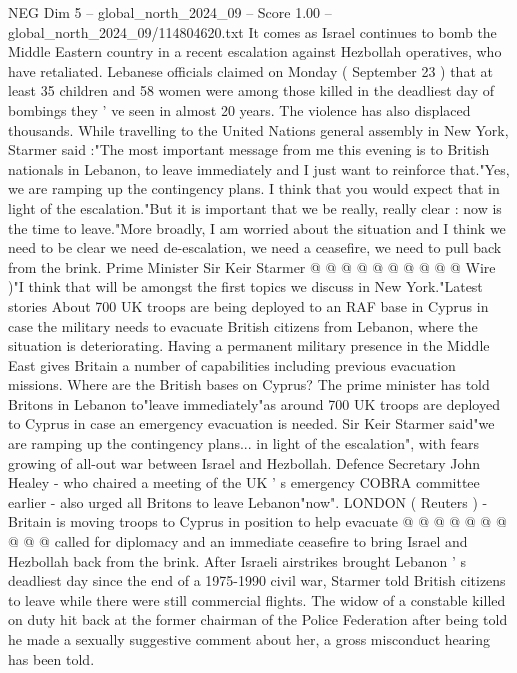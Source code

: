 \begin{textsample}{NEG Dim 5 – global\_north\_2024\_09 – Score 1.00 – global\_north\_2024\_09/114804620.txt}  \label{ex:f5_neg_094}
It comes as Israel continues to bomb the Middle Eastern country in a recent escalation against Hezbollah operatives, who have retaliated.
Lebanese officials claimed on Monday ( September 23 ) that at least 35 children and 58 women were among those killed in the deadliest day of bombings they ' ve seen in almost 20 years.
The violence has also displaced thousands.
While travelling to the United Nations general assembly in New York, Starmer said :"The most important message from me this evening is to British nationals in Lebanon, to leave immediately and I just want to reinforce that."Yes, we are ramping up the contingency plans.
I think that you would expect that in light of the escalation."But it is important that we be really, really clear : now is the time to leave."More broadly, I am worried about the situation and I think we need to be clear we need de-escalation, we need a ceasefire, we need to pull back from the brink.
Prime Minister Sir Keir Starmer @ @ @ @ @ @ @ @ @ @ Wire )"I think that will be amongst the first topics we discuss in New York."Latest stories About 700 UK troops are being deployed to an RAF base in Cyprus in case the military needs to evacuate British citizens from Lebanon, where the situation is deteriorating.
Having a permanent military presence in the Middle East gives Britain a number of capabilities including previous evacuation missions.
Where are the British bases on Cyprus?
The prime minister has told Britons in Lebanon to"leave immediately"as around 700 UK troops are deployed to Cyprus in case an emergency evacuation is needed.
Sir Keir Starmer said"we are ramping up the contingency plans... in light of the escalation", with fears growing of all-out war between Israel and Hezbollah.
Defence Secretary John Healey - who chaired a meeting of the UK ' s emergency COBRA committee earlier - also urged all Britons to leave Lebanon"now".
LONDON ( Reuters ) -Britain is moving troops to Cyprus in position to help evacuate @ @ @ @ @ @ @ @ @ @ called for diplomacy and an immediate ceasefire to bring Israel and Hezbollah back from the brink.
After Israeli airstrikes brought Lebanon ' s deadliest day since the end of a 1975-1990 civil war, Starmer told British citizens to leave while there were still commercial flights.
The widow of a constable killed on duty hit back at the former chairman of the Police Federation after being told he made a sexually suggestive comment about her, a gross misconduct hearing has been told.

\end{textsample}

